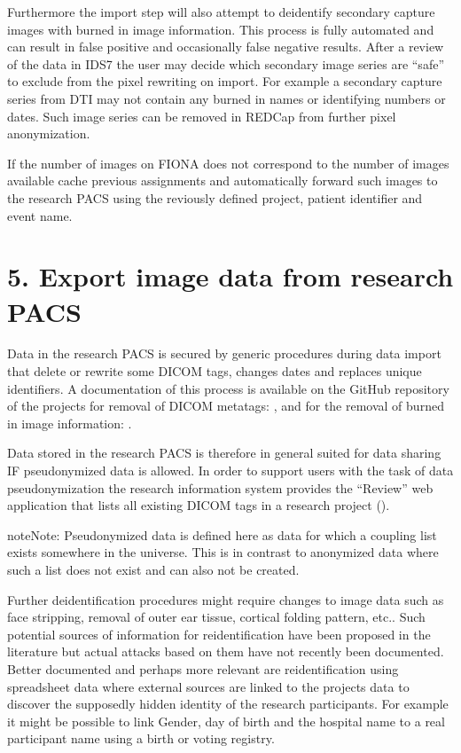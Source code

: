 \documentclass[letterpaper,10pt,english]{sphinxmanual}
\begin{document}
\sphinxAtStartPar
Furthermore the import step will also attempt to de\sphinxhyphen{}identify secondary capture images with burned in image information. This process is fully automated and can result in false positive and occasionally false negative results. After a review of the data in IDS7 the user may decide which secondary image series are “safe” to exclude from the pixel rewriting on import. For example a secondary capture series from DTI may not contain any burned in names or identifying numbers or dates. Such image series can be removed in REDCap from further pixel anonymization.

\sphinxAtStartPar
If the number of images on FIONA does not correspond to the number of images available cache previous assignments and automatically forward such images to the research PACS using the reviously defined project, patient identifier and event name.


\section{5. Export image data from research PACS}
\label{\detokenize{EndUser/index:export-image-data-from-research-pacs}}
\sphinxAtStartPar
Data in the research PACS is secured by generic procedures during data import that delete or rewrite some DICOM tags, changes dates and replaces unique identifiers. A documentation of this process is available on the GitHub repository of the projects for removal of DICOM meta\sphinxhyphen{}tags:
, and for the removal of burned in image information: .

\sphinxAtStartPar
Data stored in the research PACS is therefore in general suited for data sharing IF pseudonymized data is allowed. In order to support users with the task of data pseudonymization the research information system provides the “Review” web application that lists all existing DICOM tags in a research project ().

\begin{sphinxadmonition}{note}{Note:}
\sphinxAtStartPar
Pseudonymized data is defined here as data for which a coupling list exists somewhere in the universe. This is in contrast to anonymized data where such a list does not exist and can also not be created.
\end{sphinxadmonition}

\sphinxAtStartPar
Further de\sphinxhyphen{}identification procedures might require changes to image data such as face stripping, removal of outer ear tissue, cortical folding pattern, etc.. Such potential sources of information for re\sphinxhyphen{}identification have been proposed in the literature but actual attacks based on them have not recently been documented. Better documented and perhaps more relevant are re\sphinxhyphen{}identification using spreadsheet data where external sources are linked to the projects data to discover the supposedly hidden identity of the research participants. For example it might be possible to link Gender, day of birth and the hospital name to a real participant name using a birth or voting registry.
\end{document}
